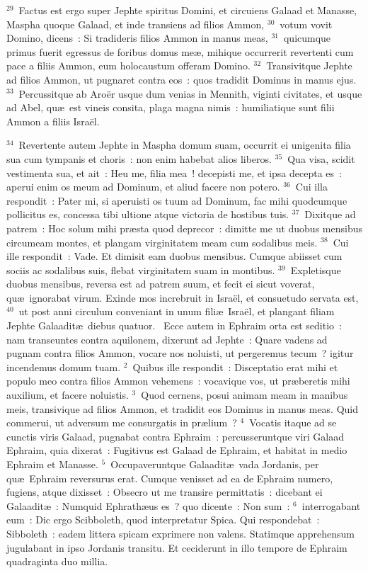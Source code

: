 ${}^{29}$~Factus est ergo super Jephte spiritus Domini, et circuiens Galaad et Manasse, Maspha quoque Galaad, et inde transiens ad filios Ammon,
${}^{30}$~votum vovit Domino, dicens~: Si tradideris filios Ammon in manus meas,
${}^{31}$~quicumque primus fuerit egressus de foribus domus me\ae , mihique occurrerit revertenti cum pace a filiis Ammon, eum holocaustum offeram Domino.
${}^{32}$~Transivitque Jephte ad filios Ammon, ut pugnaret contra eos~: quos tradidit Dominus in manus ejus.
${}^{33}$~Percussitque ab Aro\"er usque dum venias in Mennith, viginti civitates, et usque ad Abel, qu\ae\ est vineis consita, plaga magna nimis~: humiliatique sunt filii Ammon a filiis Isra\"el.


${}^{34}$~Revertente autem Jephte in Maspha domum suam, occurrit ei unigenita filia sua cum tympanis et choris~: non enim habebat alios liberos.
${}^{35}$~Qua visa, scidit vestimenta sua, et ait~: Heu me, filia mea~! decepisti me, et ipsa decepta es~: aperui enim os meum ad Dominum, et aliud facere non potero.
${}^{36}$~Cui illa respondit~: Pater mi, si aperuisti os tuum ad Dominum, fac mihi quodcumque pollicitus es, concessa tibi ultione atque victoria de hostibus tuis.
${}^{37}$~Dixitque ad patrem~: Hoc solum mihi pr\ae sta quod deprecor~: dimitte me ut duobus mensibus circumeam montes, et plangam virginitatem meam cum sodalibus meis.
${}^{38}$~Cui ille respondit~: Vade. Et dimisit eam duobus mensibus. Cumque abiisset cum sociis ac sodalibus suis, flebat virginitatem suam in montibus.
${}^{39}$~Expletisque duobus mensibus, reversa est ad patrem suum, et fecit ei sicut voverat, qu\ae\ ignorabat virum. Exinde mos increbruit in Isra\"el, et consuetudo servata est,
${}^{40}$~ut post anni circulum conveniant in unum fili\ae\ Isra\"el, et plangant filiam Jephte Galaadit\ae\ diebus quatuor.
~Ecce autem in Ephraim orta est seditio~: nam transeuntes contra aquilonem, dixerunt ad Jephte~: Quare vadens ad pugnam contra filios Ammon, vocare nos noluisti, ut pergeremus tecum~? igitur incendemus domum tuam.
${}^{2}$~Quibus ille respondit~: Disceptatio erat mihi et populo meo contra filios Ammon vehemens~: vocavique vos, ut pr\ae beretis mihi auxilium, et facere noluistis.
${}^{3}$~Quod cernens, posui animam meam in manibus meis, transivique ad filios Ammon, et tradidit eos Dominus in manus meas. Quid commerui, ut adversum me consurgatis in pr\ae lium~?
${}^{4}$~Vocatis itaque ad se cunctis viris Galaad, pugnabat contra Ephraim~: percusseruntque viri Galaad Ephraim, quia dixerat~: Fugitivus est Galaad de Ephraim, et habitat in medio Ephraim et Manasse.
${}^{5}$~Occupaveruntque Galaadit\ae\ vada Jordanis, per qu\ae\ Ephraim reversurus erat. Cumque venisset ad ea de Ephraim numero, fugiens, atque dixisset~: Obsecro ut me transire permittatis~: dicebant ei Galaadit\ae~: Numquid Ephrath\ae us es~? quo dicente~: Non sum~:
${}^{6}$~interrogabant eum~: Dic ergo Scibboleth, quod interpretatur Spica. Qui respondebat~: Sibboleth~: eadem littera spicam exprimere non valens. Statimque apprehensum jugulabant in ipso Jordanis transitu. Et ceciderunt in illo tempore de Ephraim quadraginta duo millia.


